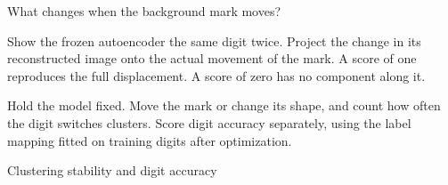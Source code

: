 \begin{frame}{What changes when the background mark moves?}
\par
Show the frozen autoencoder the same digit twice. Project the change in its reconstructed image onto the actual movement of the mark. A score of one reproduces the full displacement. A score of zero has no component along it.
\par\bigskip
{}\par
Hold the model fixed. Move the mark or change its shape, and count how often the digit switches clusters. Score digit accuracy separately, using the label mapping fitted on training digits after optimization.
\end{frame}

\begin{frame}{Clustering stability and digit accuracy}
\centering\scriptsize
\par\medskip\normalsize
{}
\end{frame}
